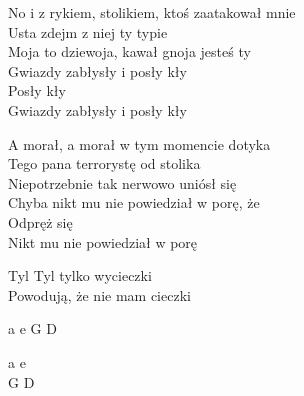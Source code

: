 \documentclass[a5paper, 10pt]{book}
\begin{document}
\begin{minipage}[t]{0.8\textwidth}
  No i z rykiem, stolikiem, ktoś zaatakował mnie\\
  Usta zdejm z niej ty typie\\
  Moja to dziewoja, kawał gnoja jesteś ty\\
  Gwiazdy zabłysły i posły kły\\
  \hspace*{5mm}Posły kły\\
  \hspace*{5mm}Gwiazdy zabłysły i posły kły\vspace*{1.6mm}

  A morał, a morał w tym momencie dotyka\\
  Tego pana terrorystę od stolika\\
  Niepotrzebnie tak nerwowo uniósł się\\
  Chyba nikt mu nie powiedział w porę, że\\
  \hspace*{5mm}Odpręż się\\
  \hspace*{5mm}Nikt mu nie powiedział w porę\vspace*{1.6mm}

  \hspace*{3mm}Tyl Tyl tylko wycieczki\\
  \hspace*{3mm}Powodują, że nie mam cieczki\\
\end{minipage}
\begin{minipage}[t]{0.2\textwidth}
  a e G D\vspace*{2mm}

  a e\\
  G D\\
\end{minipage}

\newpage
\end{document}
